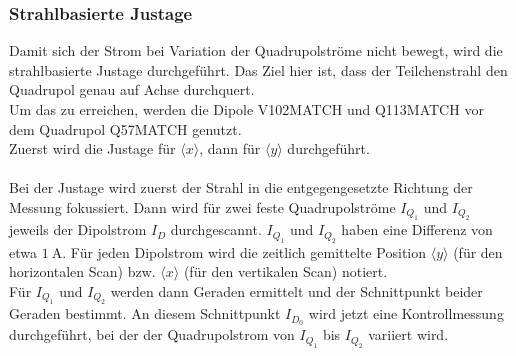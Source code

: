 \documentclass[10pt,a4paper, bibliography=totoc]{scrartcl}
\begin{document}
\subsubsection{Strahlbasierte Justage}
Damit sich der Strom bei Variation der Quadrupolströme nicht bewegt, wird die strahlbasierte Justage durchgeführt. Das Ziel hier ist, dass der Teilchenstrahl den Quadrupol genau auf Achse durchquert.\\
Um das zu erreichen, werden die Dipole V102MATCH und Q113MATCH vor dem Quadrupol Q57MATCH genutzt.\\Zuerst wird die Justage für $\langle x\rangle$, dann für $\langle y\rangle$ durchgeführt.\\\\
Bei der Justage wird zuerst der Strahl in die entgegengesetzte Richtung der Messung fokussiert. Dann wird für zwei feste Quadrupolströme $I_{Q_1}$ und $I_{Q_2}$ jeweils der Dipolstrom $I_D$ durchgescannt. $I_{Q_1}$ und $I_{Q_2}$ haben eine Differenz von etwa $\qty{1}{\ampere}$. Für jeden Dipolstrom wird die zeitlich gemittelte Position $\langle y\rangle$ (für den horizontalen Scan) bzw. $\langle x\rangle$ (für den vertikalen Scan) notiert.\\
Für $I_{Q_1}$ und $I_{Q_2}$ werden dann Geraden ermittelt und der Schnittpunkt beider Geraden bestimmt. An diesem Schnittpunkt $I_{D_0}$ wird jetzt eine Kontrollmessung durchgeführt, bei der der Quadrupolstrom von $I_{Q_1}$ bis $I_{Q_2}$ variiert wird. 
\end{document}
